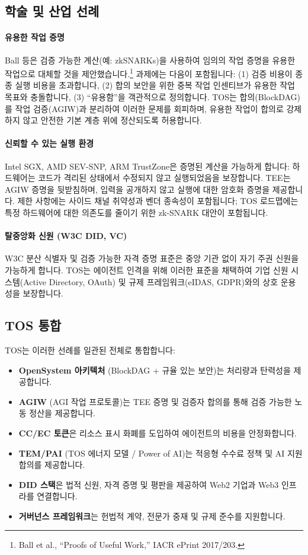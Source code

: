 \documentclass[11pt]{article}
\begin{document}
\subsection{학술 및 산업 선례}
\paragraph{유용한 작업 증명} Ball 등은 검증 가능한 계산(예: zkSNARKs)을 사용하여 임의의 작업 증명을 유용한 작업으로 대체할 것을 제안했습니다.\footnote{Ball et al., ``Proofs of Useful Work,'' IACR ePrint 2017/203.} 과제에는 다음이 포함됩니다: (1) 검증 비용이 종종 실행 비용을 초과합니다, (2) 합의 보안을 위한 중복 작업 인센티브가 유용한 작업 목표와 충돌합니다, (3) ``유용함''을 객관적으로 정의합니다. TOS는 합의(BlockDAG)를 작업 검증(AGIW)과 분리하여 이러한 문제를 회피하며, 유용한 작업이 합의로 강제하지 않고 안전한 기본 계층 위에 정산되도록 허용합니다.

\paragraph{신뢰할 수 있는 실행 환경} Intel SGX, AMD SEV-SNP, ARM TrustZone은 증명된 계산을 가능하게 합니다: 하드웨어는 코드가 격리된 상태에서 수정되지 않고 실행되었음을 보장합니다. TEE는 AGIW 증명을 뒷받침하며, 입력을 공개하지 않고 실행에 대한 암호화 증명을 제공합니다. 제한 사항에는 사이드 채널 취약성과 벤더 종속성이 포함됩니다; TOS 로드맵에는 특정 하드웨어에 대한 의존도를 줄이기 위한 zk-SNARK 대안이 포함됩니다.

\paragraph{탈중앙화 신원 (W3C DID, VC)} W3C 분산 식별자 및 검증 가능한 자격 증명 표준은 중앙 기관 없이 자기 주권 신원을 가능하게 합니다. TOS는 에이전트 인격을 위해 이러한 표준을 채택하여 기업 신원 시스템(Active Directory, OAuth) 및 규제 프레임워크(eIDAS, GDPR)와의 상호 운용성을 보장합니다.

\subsection{TOS 통합}
TOS는 이러한 선례를 일관된 전체로 통합합니다:
\begin{itemize}[noitemsep]
  \item \textbf{OpenSystem 아키텍처} (BlockDAG + 규율 있는 보안)는 처리량과 탄력성을 제공합니다.
  \item \textbf{AGIW} (AGI 작업 프로토콜)는 TEE 증명 및 검증자 합의를 통해 검증 가능한 노동 정산을 제공합니다.
  \item \textbf{CC/EC 토큰}은 리소스 표시 화폐를 도입하여 에이전트의 비용을 안정화합니다.
  \item \textbf{TEM/PAI} (TOS 에너지 모델 / Power of AI)는 적응형 수수료 정책 및 AI 지원 합의를 제공합니다.
  \item \textbf{DID 스택}은 법적 신원, 자격 증명 및 평판을 제공하여 Web2 기업과 Web3 인프라를 연결합니다.
  \item \textbf{거버넌스 프레임워크}는 헌법적 계약, 전문가 중재 및 규제 준수를 지원합니다.
\end{itemize}
\end{document}
